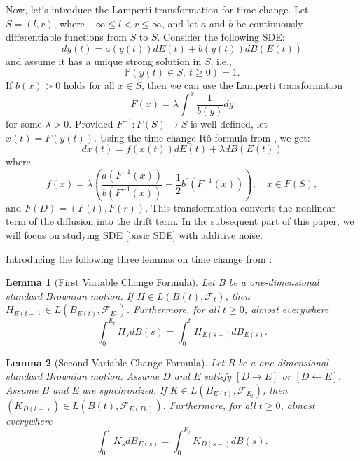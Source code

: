 \documentclass[10pt,reqno,final]{amsart}
\theoremstyle{plain}
\newtheorem{lemma}{Lemma}[section]
\theoremstyle{definition}
\theoremstyle{remark}
\numberwithin{equation}{section}
\numberwithin{figure}{section}
\numberwithin{table}{section}
\begin{document}
Now, let's introduce the Lamperti transformation for time change. 
Let \( S = (l, r) \), where \( -\infty \leq l < r \leq \infty \), and let \( a \) and \( b \) be continuously differentiable functions from \( S \) to \( S \). Consider the following SDE:
\begin{equation}\label{original SDE}
	dy(t) = a(y(t))dE(t) + b(y(t))dB(E(t))
\end{equation}
and assume it has a unique strong solution in \( S \), i.e.,
$$
\mathbb{P}(y(t) \in S, \: t \geq 0) = 1.
$$
If \( b(x) > 0 \) holds for all \( x \in S \), then we can use the Lamperti transformation
\begin{equation}\label{Lamperti}
	F(x) = \lambda \int^x \frac{1}{b(y)} dy
\end{equation}
for some \( \lambda > 0 \). Provided \( F^{-1}: F(S) \to S \) is well-defined, let \( x(t) = F(y(t)) \). Using the time-change Itô formula from \cite{umarov2018beyond}, we get:
\begin{equation}\label{basic SDE}
	dx(t) = f(x(t)) dE(t) + \lambda dB(E(t))
\end{equation}
where
$$
f(x) = \lambda \left( \frac{a(F^{-1}(x))}{b(F^{-1}(x))} - \frac{1}{2} b^{\prime}(F^{-1}(x)) \right), \quad x \in F(S),
$$
and \( F(D) = (F(l), F(r)) \). This transformation converts the nonlinear term of the diffusion into the drift term. In the subsequent part of this paper, we will focus on studying SDE \eqref{basic SDE} with additive noise.



Introducing the following three lemmas on time change from \cite{umarov2018beyond}:

\begin{lemma}[First Variable Change Formula]\label{first}
	Let B be a one-dimensional standard Brownian motion.
	If $H \in L(B(t), \mathcal{F}_t)$, then $H_{E(t-)} \in L(B_{E(t)}, \mathcal{F}_{E_t})$.
	Furthermore, for all $t \geqslant 0$, almost everywhere
	$$
	\int_0^{E_t} H_s dB(s) = \int_0^t H_{E(s-)} dB_{E(s)}.
	$$
\end{lemma}
\begin{lemma}[Second Variable Change Formula]\label{second}
	Let B be a one-dimensional standard Brownian motion. Assume $D$ and $E$ satisfy $[D \longrightarrow E]$ or $[D \longleftarrow E]$.
	Assume $B$ and $E$ are synchronized. If $K \in L(B_{E(t)}, \mathcal{F}_{E_t})$, then $(K_{D(t-)}) \in L(B(t), \mathcal{F}_{E(D_t)})$.
	Furthermore, for all $t \geqslant 0$, almost everywhere
	$$
	\int_0^t K_s dB_{E(s)} = \int_0^{E_t} K_{D(s-)} dB(s).
	$$
\end{lemma}
\end{document}
